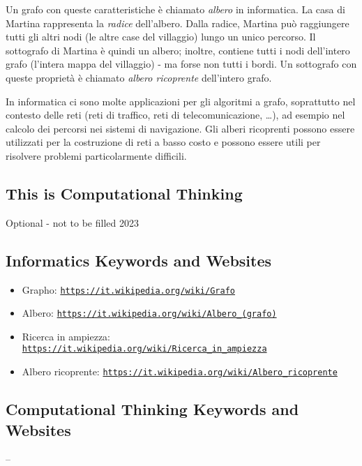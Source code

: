 \documentclass[a4paper,11pt]{report}
\newcommand{\BrochureUrlText}[1]{\texttt{#1}}
\begin{document}
Un grafo con queste caratteristiche è chiamato \emph{albero} in informatica. La casa di Martina rappresenta la \emph{radice} dell’albero. Dalla radice, Martina può raggiungere tutti gli altri nodi (le altre case del villaggio) lungo un unico percorso. Il sottografo di Martina è quindi un albero; inoltre, contiene tutti i nodi dell’intero grafo (l’intera mappa del villaggio) - ma forse non tutti i bordi. Un sottografo con queste proprietà è chiamato \emph{albero ricoprente} dell’intero grafo.

In informatica ci sono molte applicazioni per gli algoritmi a grafo, soprattutto nel contesto delle reti (reti di traffico, reti di telecomunicazione, …), ad esempio nel calcolo dei percorsi nei sistemi di navigazione. Gli alberi ricoprenti possono essere utilizzati per la costruzione di reti a basso costo e possono essere utili per risolvere problemi particolarmente difficili.


\subsection*{This is Computational Thinking}

Optional - not to be filled 2023


\subsection*{Informatics Keywords and Websites}

\begin{itemize}
  \item Grapho: \href{https://it.wikipedia.org/wiki/Grafo}{\BrochureUrlText{https://it.wikipedia.org/wiki/Grafo}}
  \item Albero: \href{https://it.wikipedia.org/wiki/Albero_(grafo)}{\BrochureUrlText{https://it.wikipedia.org/wiki/Albero\_(grafo)}}
  \item Ricerca in ampiezza: \href{https://it.wikipedia.org/wiki/Ricerca_in_ampiezza}{\BrochureUrlText{https://it.wikipedia.org/wiki/Ricerca\_in\_ampiezza}}
  \item Albero ricoprente: \href{https://it.wikipedia.org/wiki/Albero_ricoprente}{\BrochureUrlText{https://it.wikipedia.org/wiki/Albero\_ricoprente}}
\end{itemize}


\subsection*{Computational Thinking Keywords and Websites}

–
\end{document}
